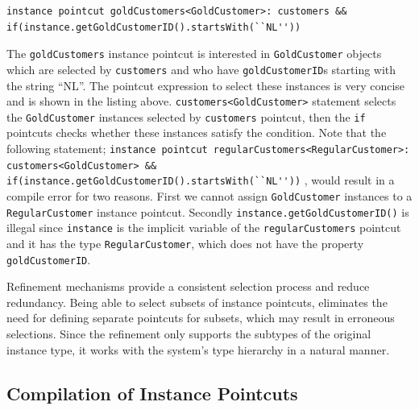 \documentclass{llncs}
\begin{document}
\begin{lstlisting}[float=h!]
instance pointcut goldCustomers<GoldCustomer>: customers &&  if(instance.getGoldCustomerID().startsWith(``NL''))
\end{lstlisting}

The \texttt{goldCustomers} instance pointcut is interested in \texttt{GoldCustomer} objects which are selected by \texttt{customers} and who have \texttt{goldCustomerID}s starting with the string ``NL''. The pointcut expression to select these instances is very concise and is shown in the listing above. \texttt{customers<GoldCustomer>} statement selects the \texttt{GoldCustomer} instances selected by \texttt{customers} pointcut, then the \texttt{if} pointcuts checks whether these instances satisfy the condition. Note that the following statement; \lstinline!instance pointcut regularCustomers<RegularCustomer>: customers<GoldCustomer> &&  if(instance.getGoldCustomerID().startsWith(``NL''))! , would result in a compile error for two reasons. First we cannot assign \texttt{GoldCustomer} instances to a \texttt{RegularCustomer} instance pointcut. Secondly \texttt{instance.getGoldCustomerID()} is illegal since \texttt{instance} is the implicit variable of the \texttt{regularCustomers} pointcut and it has the type \texttt{RegularCustomer}, which does not have the property \texttt{goldCustomerID}.

Refinement mechanisms provide a consistent selection process and reduce redundancy. Being able to select subsets of instance pointcuts, eliminates the need for defining separate pointcuts for subsets, which may result in erroneous selections. Since the refinement only supports the subtypes of the original instance type, it works with the system's type hierarchy in a natural manner. 


\subsection{Compilation of Instance Pointcuts}
\end{document}
